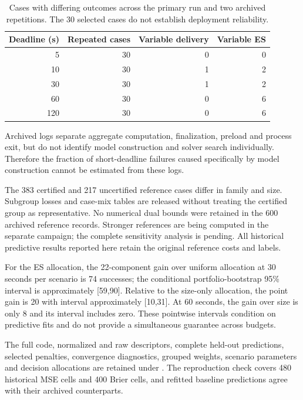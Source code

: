 \begin{table}[htbp]\centering\small\begin{tabular}{rrrr}\toprule Deadline (s) & Repeated cases & Variable delivery & Variable ES\\\midrule

5 & 30 & 0 & 0\\

10 & 30 & 1 & 2\\

30 & 30 & 1 & 2\\

60 & 30 & 0 & 6\\

120 & 30 & 0 & 6\\

\bottomrule\end{tabular}\caption{Cases with differing outcomes across the primary run and two archived repetitions. The 30 selected cases do not establish deployment reliability.}\end{table}

Archived logs separate aggregate computation, finalization, preload and process exit, but do not identify model construction and solver search individually. Therefore the fraction of short-deadline failures caused specifically by model construction cannot be estimated from these logs.

The 383 certified and 217 uncertified reference cases differ in family and size. Subgroup losses and case-mix tables are released without treating the certified group as representative. No numerical dual bounds were retained in the 600 archived reference records. Stronger references are being computed in the separate campaign; the complete sensitivity analysis is pending. All historical predictive results reported here retain the original reference costs and labels.

For the ES allocation, the 22-component gain over uniform allocation at 30 seconds per scenario is 74 successes; the conditional portfolio-bootstrap 95\% interval is approximately [59,90]. Relative to the size-only allocation, the point gain is 20 with interval approximately [10,31]. At 60 seconds, the gain over size is only 8 and its interval includes zero. These pointwise intervals condition on predictive fits and do not provide a simultaneous guarantee across budgets.

The full code, normalized and raw descriptors, complete held-out predictions, selected penalties, convergence diagnostics, grouped weights, scenario parameters and decision allocations are retained under . The reproduction check covers 480 historical MSE cells and 400 Brier cells, and refitted baseline predictions agree with their archived counterparts.
